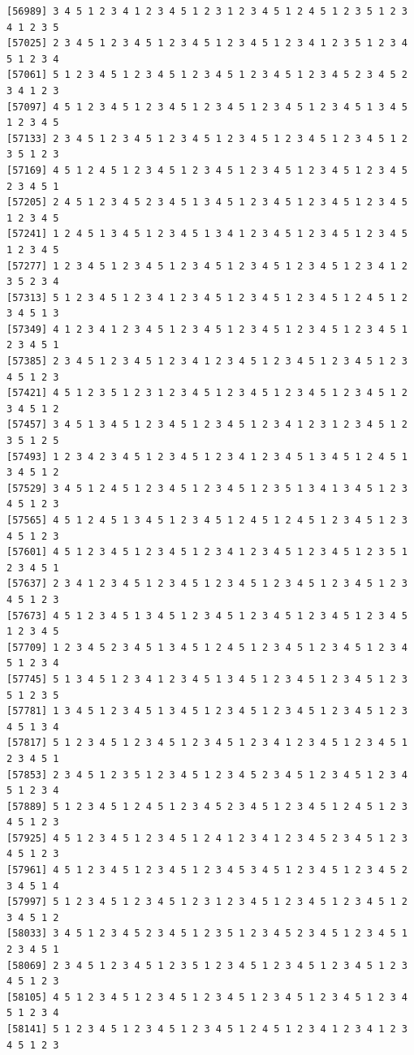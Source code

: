 \documentclass[
  english,
]{book}
\begin{document}
\begin{verbatim}
[56989] 3 4 5 1 2 3 4 1 2 3 4 5 1 2 3 1 2 3 4 5 1 2 4 5 1 2 3 5 1 2 3 4 1 2 3 5
[57025] 2 3 4 5 1 2 3 4 5 1 2 3 4 5 1 2 3 4 5 1 2 3 4 1 2 3 5 1 2 3 4 5 1 2 3 4
[57061] 5 1 2 3 4 5 1 2 3 4 5 1 2 3 4 5 1 2 3 4 5 1 2 3 4 5 2 3 4 5 2 3 4 1 2 3
[57097] 4 5 1 2 3 4 5 1 2 3 4 5 1 2 3 4 5 1 2 3 4 5 1 2 3 4 5 1 3 4 5 1 2 3 4 5
[57133] 2 3 4 5 1 2 3 4 5 1 2 3 4 5 1 2 3 4 5 1 2 3 4 5 1 2 3 4 5 1 2 3 5 1 2 3
[57169] 4 5 1 2 4 5 1 2 3 4 5 1 2 3 4 5 1 2 3 4 5 1 2 3 4 5 1 2 3 4 5 2 3 4 5 1
[57205] 2 4 5 1 2 3 4 5 2 3 4 5 1 3 4 5 1 2 3 4 5 1 2 3 4 5 1 2 3 4 5 1 2 3 4 5
[57241] 1 2 4 5 1 3 4 5 1 2 3 4 5 1 3 4 1 2 3 4 5 1 2 3 4 5 1 2 3 4 5 1 2 3 4 5
[57277] 1 2 3 4 5 1 2 3 4 5 1 2 3 4 5 1 2 3 4 5 1 2 3 4 5 1 2 3 4 1 2 3 5 2 3 4
[57313] 5 1 2 3 4 5 1 2 3 4 1 2 3 4 5 1 2 3 4 5 1 2 3 4 5 1 2 4 5 1 2 3 4 5 1 3
[57349] 4 1 2 3 4 1 2 3 4 5 1 2 3 4 5 1 2 3 4 5 1 2 3 4 5 1 2 3 4 5 1 2 3 4 5 1
[57385] 2 3 4 5 1 2 3 4 5 1 2 3 4 1 2 3 4 5 1 2 3 4 5 1 2 3 4 5 1 2 3 4 5 1 2 3
[57421] 4 5 1 2 3 5 1 2 3 1 2 3 4 5 1 2 3 4 5 1 2 3 4 5 1 2 3 4 5 1 2 3 4 5 1 2
[57457] 3 4 5 1 3 4 5 1 2 3 4 5 1 2 3 4 5 1 2 3 4 1 2 3 1 2 3 4 5 1 2 3 5 1 2 5
[57493] 1 2 3 4 2 3 4 5 1 2 3 4 5 1 2 3 4 1 2 3 4 5 1 3 4 5 1 2 4 5 1 3 4 5 1 2
[57529] 3 4 5 1 2 4 5 1 2 3 4 5 1 2 3 4 5 1 2 3 5 1 3 4 1 3 4 5 1 2 3 4 5 1 2 3
[57565] 4 5 1 2 4 5 1 3 4 5 1 2 3 4 5 1 2 4 5 1 2 4 5 1 2 3 4 5 1 2 3 4 5 1 2 3
[57601] 4 5 1 2 3 4 5 1 2 3 4 5 1 2 3 4 1 2 3 4 5 1 2 3 4 5 1 2 3 5 1 2 3 4 5 1
[57637] 2 3 4 1 2 3 4 5 1 2 3 4 5 1 2 3 4 5 1 2 3 4 5 1 2 3 4 5 1 2 3 4 5 1 2 3
[57673] 4 5 1 2 3 4 5 1 3 4 5 1 2 3 4 5 1 2 3 4 5 1 2 3 4 5 1 2 3 4 5 1 2 3 4 5
[57709] 1 2 3 4 5 2 3 4 5 1 3 4 5 1 2 4 5 1 2 3 4 5 1 2 3 4 5 1 2 3 4 5 1 2 3 4
[57745] 5 1 3 4 5 1 2 3 4 1 2 3 4 5 1 3 4 5 1 2 3 4 5 1 2 3 4 5 1 2 3 5 1 2 3 5
[57781] 1 3 4 5 1 2 3 4 5 1 3 4 5 1 2 3 4 5 1 2 3 4 5 1 2 3 4 5 1 2 3 4 5 1 3 4
[57817] 5 1 2 3 4 5 1 2 3 4 5 1 2 3 4 5 1 2 3 4 1 2 3 4 5 1 2 3 4 5 1 2 3 4 5 1
[57853] 2 3 4 5 1 2 3 5 1 2 3 4 5 1 2 3 4 5 2 3 4 5 1 2 3 4 5 1 2 3 4 5 1 2 3 4
[57889] 5 1 2 3 4 5 1 2 4 5 1 2 3 4 5 2 3 4 5 1 2 3 4 5 1 2 4 5 1 2 3 4 5 1 2 3
[57925] 4 5 1 2 3 4 5 1 2 3 4 5 1 2 4 1 2 3 4 1 2 3 4 5 2 3 4 5 1 2 3 4 5 1 2 3
[57961] 4 5 1 2 3 4 5 1 2 3 4 5 1 2 3 4 5 3 4 5 1 2 3 4 5 1 2 3 4 5 2 3 4 5 1 4
[57997] 5 1 2 3 4 5 1 2 3 4 5 1 2 3 1 2 3 4 5 1 2 3 4 5 1 2 3 4 5 1 2 3 4 5 1 2
[58033] 3 4 5 1 2 3 4 5 2 3 4 5 1 2 3 5 1 2 3 4 5 2 3 4 5 1 2 3 4 5 1 2 3 4 5 1
[58069] 2 3 4 5 1 2 3 4 5 1 2 3 5 1 2 3 4 5 1 2 3 4 5 1 2 3 4 5 1 2 3 4 5 1 2 3
[58105] 4 5 1 2 3 4 5 1 2 3 4 5 1 2 3 4 5 1 2 3 4 5 1 2 3 4 5 1 2 3 4 5 1 2 3 4
[58141] 5 1 2 3 4 5 1 2 3 4 5 1 2 3 4 5 1 2 4 5 1 2 3 4 1 2 3 4 1 2 3 4 5 1 2 3

\end{verbatim}
\end{document}
